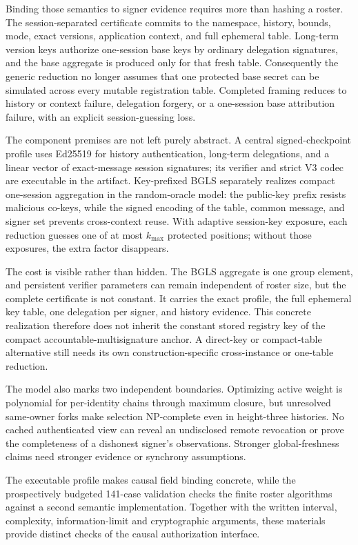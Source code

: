 \documentclass[11pt]{article}
\theoremstyle{definition}
\begin{document}
Binding those semantics to signer evidence requires more than hashing a roster.  The session-separated certificate commits to the namespace, history, bounds, mode, exact versions, application context, and full ephemeral table.  Long-term version keys authorize one-session base keys by ordinary delegation signatures, and the base aggregate is produced only for that fresh table.  Consequently the generic reduction no longer assumes that one protected base secret can be simulated across every mutable registration table.  Completed framing reduces to history or context failure, delegation forgery, or a one-session base attribution failure, with an explicit session-guessing loss.

The component premises are not left purely abstract.  A central signed-checkpoint profile uses Ed25519 for history authentication, long-term delegations, and a linear vector of exact-message session signatures; its verifier and strict V3 codec are executable in the artifact.  Key-prefixed BGLS separately realizes compact one-session aggregation in the random-oracle model: the public-key prefix resists malicious co-keys, while the signed encoding of the table, common message, and signer set prevents cross-context reuse.  With adaptive session-key exposure, each reduction guesses one of at most $k_{\max}$ protected positions; without those exposures, the extra factor disappears.

The cost is visible rather than hidden.  The BGLS aggregate is one group element, and persistent verifier parameters can remain independent of roster size, but the complete certificate is not constant.  It carries the exact profile, the full ephemeral key table, one delegation per signer, and history evidence.  This concrete realization therefore does not inherit the constant stored registry key of the compact accountable-multisignature anchor.  A direct-key or compact-table alternative still needs its own construction-specific cross-instance or one-table reduction.

The model also marks two independent boundaries.  Optimizing active weight is polynomial for per-identity chains through maximum closure, but unresolved same-owner forks make selection NP-complete even in height-three histories.  No cached authenticated view can reveal an undisclosed remote revocation or prove the completeness of a dishonest signer's observations.  Stronger global-freshness claims need stronger evidence or synchrony assumptions.

The executable profile makes causal field binding concrete, while the prospectively budgeted 141-case validation checks the finite roster algorithms against a second semantic implementation. Together with the written interval, complexity, information-limit and cryptographic arguments, these materials provide distinct checks of the causal authorization interface.
\end{document}
